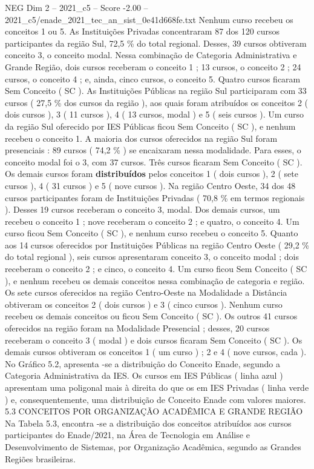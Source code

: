 \begin{textsample}{NEG Dim 2 – 2021\_c5 – Score -2.00 – 2021\_c5/enade\_2021\_tec\_an\_sist\_0e41d668fe.txt}
Nenhum curso recebeu os conceitos 1 ou 5.
As Instituições Privadas concentraram 87 dos 120 cursos participantes da região Sul, 72,5 \% do total regional.
Desses, 39 cursos obtiveram conceito 3, o conceito modal.
Nessa combinação de Categoria Administrativa e Grande Região, dois cursos receberam o conceito 1 ; 13 cursos, o conceito 2 ; 24 cursos, o conceito 4 ; e, ainda, cinco cursos, o conceito 5.
Quatro cursos ficaram Sem Conceito ( SC ).
As Instituições Públicas na região Sul participaram com 33 cursos ( 27,5 \% dos cursos da região ), aos quais foram atribuídos os conceitos 2 ( dois cursos ), 3 ( 11 cursos ), 4 ( 13 cursos, modal ) e 5 ( seis cursos ).
Um curso da região Sul oferecido por IES Públicas ficou Sem Conceito ( SC ), e nenhum recebeu o conceito 1.
A maioria dos cursos oferecidos na região Sul foram presenciais : 89 cursos ( 74,2 \% ) se encaixaram nessa modalidade.
Para esses, o conceito modal foi o 3, com 37 cursos.
Três cursos ficaram Sem Conceito ( SC ).
Os demais cursos foram \textbf{distribuídos} pelos conceitos 1 ( dois cursos ), 2 ( sete cursos ), 4 ( 31 cursos ) e 5 ( nove cursos ).
Na região Centro Oeste, 34 dos 48 cursos participantes foram de Instituições Privadas ( 70,8 \% em termos regionais ).
Desses 19 cursos receberam o conceito 3, modal.
Dos demais cursos, um recebeu o conceito 1 ; nove receberam o conceito 2 ; e quatro, o conceito 4.
Um curso ficou Sem Conceito ( SC ), e nenhum curso recebeu o conceito 5.
Quanto aos 14 cursos oferecidos por Instituições Públicas na região Centro Oeste ( 29,2 \% do total regional ), seis cursos apresentaram conceito 3, o conceito modal ; dois receberam o conceito 2 ; e cinco, o conceito 4.
Um curso ficou Sem Conceito ( SC ), e nenhum recebeu os demais conceitos nessa combinação de categoria e região.
Os sete cursos oferecidos na região Centro-Oeste na Modalidade a Distância obtiveram os conceitos 2 ( dois cursos ) e 3 ( cinco cursos ).
Nenhum curso recebeu os demais conceitos ou ficou Sem Conceito ( SC ).
Os outros 41 cursos oferecidos na região foram na Modalidade Presencial ; desses, 20 cursos receberam o conceito 3 ( modal ) e dois cursos ficaram Sem Conceito ( SC ).
Os demais cursos obtiveram os conceitos 1 ( um curso ) ; 2 e 4 ( nove cursos, cada ).
No Gráfico 5.2, apresenta -se a distribuição do Conceito Enade, segundo a Categoria Administrativa da IES.
Os cursos em IES Públicas ( linha azul ) apresentam uma poligonal mais à direita do que os em IES Privadas ( linha verde ) e, consequentemente, uma distribuição de Conceito Enade com valores maiores. 5.3 CONCEITOS POR ORGANIZAÇÃO ACADÊMICA E GRANDE REGIÃO Na Tabela 5.3, encontra -se a distribuição dos conceitos atribuídos aos cursos participantes do Enade/2021, na Área de Tecnologia em Análise e Desenvolvimento de Sistemas, por Organização Acadêmica, segundo as Grandes Regiões brasileiras.

\end{textsample}
